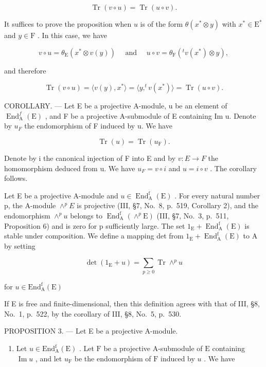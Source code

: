 \[
\operatorname{Tr} (v \circ u) = \operatorname{Tr} (u \circ v).\tag{3}
\]

It suffices to prove the proposition when \(u\) is of the form \(\theta(x^{*} \otimes y)\) with \(x^{*} \in \mathrm{E}^{*}\) and \(y \in \mathrm{F}\) . In this case, we have

\[
v \circ u = \theta_ {\mathrm{E}} (x ^ {*} \otimes v (y)) \quad \text { and } \quad u \circ v = \theta_ {\mathrm{F}} (^ {t} v (x ^ {*}) \otimes y)  ,
\]

and therefore

\[
\operatorname{Tr} (v \circ u) = \langle v (y), x ^ {*} \rangle = \langle y, ^ {t} v (x ^ {*}) \rangle = \operatorname{Tr} (u \circ v).
\]

COROLLARY. --- Let E be a projective A-module, u be an element of \(\operatorname{End}_{\mathrm{A}}^{f}(\mathrm{E})\) , and F be a projective A-submodule of E containing Im u. Denote by \(u_{F}\) the endomorphism of F induced by u. We have

\[
\operatorname{Tr} (u) = \operatorname{Tr} (u _ {\mathrm{F}}).\tag{4}
\]

Denote by i the canonical injection of F into E and by \(v: E \rightarrow F\) the homomorphism deduced from u. We have \(u_{F} = v \circ i\) and \(u = i \circ v\) . The corollary follows.

Let E be a projective A-module and \(u \in \operatorname{End}_{\mathrm{A}}^{\mathrm{f}}(\mathrm{E})\) . For every natural number p, the A-module \(\wedge^{p}E\) is projective (III, §7, No.~8, p.~519, Corollary 2), and the endomorphism \(\wedge^{p}u\) belongs to \(\operatorname{End}_{\mathrm{A}}^{\mathrm{f}}(\wedge^{p}\mathrm{E})\) (III, §7, No.~3, p.~511, Proposition 6) and is zero for p sufficiently large. The set \(1_{\mathrm{E}} + \operatorname{End}_{\mathrm{A}}^{\mathrm{f}}(\mathrm{E})\) is stable under composition. We define a mapping det from \(1_{\mathrm{E}} + \operatorname{End}_{\mathrm{A}}^{\mathrm{f}}(\mathrm{E})\) to A by setting

\[
\det (1 _ {\mathrm{E}} + u) = \sum_ {p \geqslant 0} \operatorname{Tr} \wedge^ {p} u
\]

for \(u\in \mathrm{End}_{\mathrm{A}}^{\mathrm{f}}(\mathrm{E})\)

If E is free and finite-dimensional, then this definition agrees with that of III, §8, No.~1, p.~522, by the corollary of III, §8, No.~5, p.~530.

PROPOSITION 3. --- Let E be a projective A-module.

\begin{enumerate}
\def\labelenumi{\alph{enumi})}
\tightlist
\item
  Let \(u \in \mathrm{End}_{\mathrm{A}}^{\mathrm{f}}(\mathrm{E})\) . Let \(\mathrm{F}\) be a projective A-submodule of \(\mathrm{E}\) containing \(\operatorname{Im} u\) , and let \(u_{\mathrm{F}}\) be the endomorphism of \(\mathrm{F}\) induced by \(u\) . We have
\end{enumerate}

